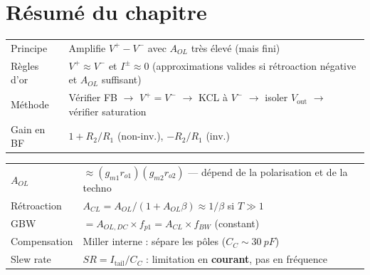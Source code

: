 \documentclass[12pt,a4paper,twoside]{book}
\begin{document}
\section*{Résumé du chapitre}

\begin{bases}[title={\color{white} Résumé --- Les Bases}]
\begin{center}
\renewcommand{\arraystretch}{1.3}
\begin{tabular}{p{3.5cm}p{9.5cm}}
\toprule
Principe & Amplifie $V^+ - V^-$ avec $A_{OL}$ très élevé (mais fini) \\
Règles d'or & $V^+ \approx V^-$ et $I^{\pm} \approx 0$ (approximations valides si rétroaction négative et $A_{OL}$ suffisant) \\
Méthode & Vérifier FB $\to$ $V^+=V^-$ $\to$ KCL à $V^-$ $\to$ isoler $V_{\text{out}}$ $\to$ vérifier saturation \\
Gain en BF & $1+R_2/R_1$ (non-inv.), $-R_2/R_1$ (inv.) \\
\bottomrule
\end{tabular}
\end{center}
\end{bases}

\begin{approfondissement}[title={\color{white} Résumé --- Approfondissement}]
\begin{center}
\renewcommand{\arraystretch}{1.3}
\begin{tabular}{p{3.5cm}p{9.5cm}}
\toprule
$A_{OL}$ & $\approx (g_{m1}r_{o1})(g_{m2}r_{o2})$ --- dépend de la polarisation et de la techno \\
Rétroaction & $A_{CL} = A_{OL}/(1+A_{OL}\beta) \approx 1/\beta$ si $T \gg 1$ \\
GBW & $= A_{OL,DC} \times f_{p1} = A_{CL} \times f_{BW}$ (constant) \\
Compensation & Miller interne : sépare les pôles ($C_C \sim \SI{30}{pF}$) \\
Slew rate & $SR = I_{\text{tail}}/C_C$ : limitation en \textbf{courant}, pas en fréquence \\
\bottomrule
\end{tabular}
\end{center}
\end{approfondissement}
\end{document}
